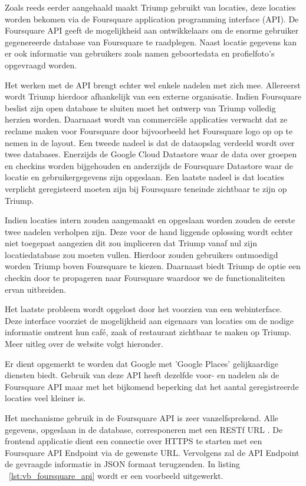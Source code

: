 Zoals reeds eerder aangehaald maakt Triump gebruikt van locaties, deze locaties worden bekomen via de Foursquare application programming interface (API). De Foursquare API geeft de mogelijkheid aan ontwikkelaars om de enorme gebruiker gegenereerde database van Foursquare te raadplegen. Naast locatie gegevens kan er ook informatie van gebruikers zoals namen geboortedata en profielfoto's opgevraagd worden. 

Het werken met de API brengt echter wel enkele nadelen met zich mee.
Allereerst wordt Triump hierdoor afhankelijk van een externe organisatie. Indien Foursquare beslist zijn open database te sluiten moet het ontwerp van Triump volledig herzien worden. Daarnaast wordt van commerciële applicaties verwacht dat ze reclame maken voor Foursquare door bijvoorbeeld het Foursquare logo op op te nemen in de layout.  Een tweede nadeel is dat de dataopslag verdeeld wordt over twee databases. Enerzijds de Google Cloud Datastore waar de data over groepen en checkins worden bijgehouden en anderzijds de Foursquare Datastore waar de locatie en gebruikergegevens zijn opgeslaan. Een laatste nadeel is dat locaties verplicht geregisteerd moeten zijn bij Foursquare teneinde zichtbaar te zijn op Triump. 

Indien locaties intern zouden aangemaakt en opgeslaan worden zouden de eerste twee nadelen verholpen zijn. 
Deze voor de hand liggende oplossing wordt echter niet toegepast aangezien dit zou impliceren dat Triump vanaf nul zijn locatiedatabase zou moeten vullen. Hierdoor zouden gebruikers ontmoedigd worden Triump boven Foursquare te kiezen. Daarnaast biedt Triump de optie een checkin door te propageren naar Foursquare waardoor we de functionaliteiten ervan uitbreiden. 

Het laatste probleem wordt opgelost door het voorzien van een webinterface. Deze interface voorziet de mogelijkheid aan eigenaars van locaties om de nodige informatie omtrent hun café, zaak of restaurant zichtbaar te maken op Triump. Meer uitleg over de website volgt hieronder.

Er dient opgemerkt te worden dat Google met 'Google Places' gelijkaardige diensten biedt. Gebruik van deze API heeft dezelfde voor- en nadelen als de Foursquare API maar met het bijkomend beperking dat het aantal geregistreerde locaties veel kleiner is.


Het mechanisme gebruik in de Foursquare API is zeer vanzelfsprekend. Alle gegevens, opgeslaan in de database, corresponeren met een RESTf URL \cite{FS_API_website}. De frontend applicatie dient een connectie over HTTPS te starten met een Foursquare API Endpoint via de gewenste URL. Vervolgens zal de API Endpoint de gevraagde informatie in JSON formaat terugzenden. In listing ~\ref{lst:vb_foursquare_api} wordt er een voorbeeld uitgewerkt.


